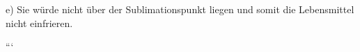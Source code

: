 e) Sie würde nicht über der Sublimationspunkt liegen und somit die Lebensmittel nicht einfrieren.

```